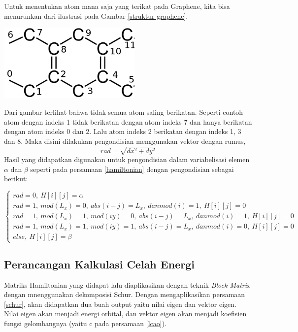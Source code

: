 \documentclass[12pt,a4paper]{report}
\begin{document}
	Untuk menentukan atom mana saja yang terikat pada Graphene, kita bisa menurunkan dari ilustrasi pada Gambar \ref{struktur-graphene}.
	\begin{center}
		\includegraphics[width=7cm]{gambar/struk.png}
		\label{struktur-graphene}
	\end{center}
	Dari gambar terlihat bahwa tidak semua atom saling berikatan. Seperti contoh atom dengan indeks 1 tidak berikatan dengan atom indeks 7 dan hanya berikatan dengan atom indeks 0 dan 2. Lalu atom indeks 2 berikatan dengan indeks 1, 3 dan 8. Maka disini dilakukan pengondisian menggunakan vektor dengan rumus,
	\begin{equation}
	rad = \sqrt{dx^2 + dy^2}
	\end{equation}
	Hasil yang didapatkan digunakan untuk pengondisian dalam variabelisasi elemen $\alpha$ dan $\beta$ seperti pada persamaan \eqref{hamiltonian} dengan pengondisian sebagai berikut:
	
	\begin{equation}
	\begin{cases}
	rad = 0, \ H[i][j] = \alpha \\
	rad = 1, \ mod(L_x) = 0, \ abs(i-j) = L_x, \ dan mod(i) = 1, \ H[i][j] = 0 \\
	rad = 1, \ mod(L_x) = 1, \ mod(iy) = 0, \ abs(i-j) = L_x, \ dan mod(i) = 1, \ H[i][j] = 0 \\
	rad = 1, \ mod(L_x) = 1, \ mod(iy) = 1, \ abs(i-j) = L_x, \ dan mod(i) = 0, \ H[i][j] = 0 \\
	else, \ H[i][j] = \beta
	\end{cases}
	\end{equation}
	
	\subsection{Perancangan Kalkulasi Celah Energi}
	
	Matriks Hamiltonian yang didapat lalu diaplikasikan dengan teknik \textit{Block Matrix} dengan mnenggunakan dekomposisi Schur. Dengan mengaplikasikan persamaan \eqref{schur}, akan didapatkan dua buah output yaitu nilai eigen dan vektor eigen. Nilai eigen akan menjadi energi orbital, dan vektor eigen akan menjadi koefisien fungsi gelombangnya (yaitu c pada persamaan \eqref{lcao}).
	
\end{document}
